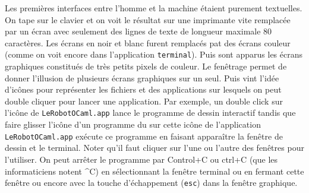 {\begin{minipage}{\myparboxwidth}
Les premières interfaces entre l'homme et la machine étaient purement textuelles. On tape sur
le clavier et on voit le résultat sur une imprimante vite remplacée par un écran avec seulement
des lignes de texte de longueur maximale 80 caractères. Les écrans en noir et blanc furent
remplacés pat des écrans couleur (comme on voit encore dans l'application \texttt{terminal}).
Puis sont apparus les écrans graphiques constitués de très petits pixels de couleur. Le
fenêtrage permet de donner l'illusion de plusieurs écrans graphiques sur un seul. Puis vint
l'idée d'icônes pour représenter les fichiers et des applications sur lesquels on peut
double cliquer pour lancer une application. Par exemple,  un double click sur l'icône de
\texttt{LeRobotOCaml.app} lance le programme de dessin interactif tandis que faire glisser l'icône
d'un programme du \robot sur cette icône de l'application \texttt{LeRobotOCaml.app} exécute ce programme
en faisant apparaître la fenêtre de dessin et le terminal. Noter qu'il faut cliquer sur
l'une ou l'autre des fenêtres pour l'utiliser. On peut arrêter le programme par Control+C ou
ctrl+C (que les informaticiens notent \^{}C) en sélectionnant la fenêtre terminal ou en fermant cette fenêtre ou encore avec la touche  d'échappement (\texttt{esc}) dans la fenêtre graphique.

\end{minipage}
}

